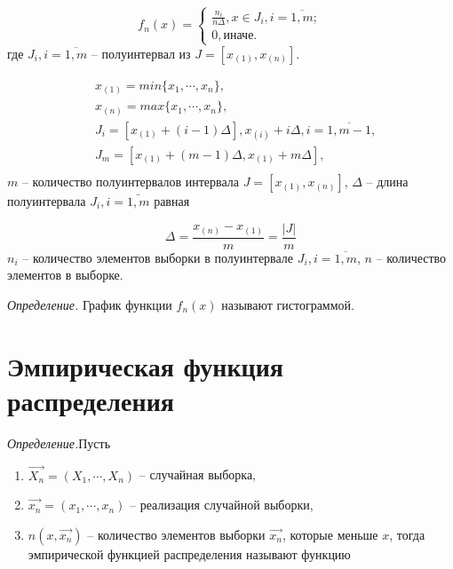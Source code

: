 \begin{equation}
    f_n(x) = \begin{cases}
        \frac{n_i}{n\Delta}, x \in J_i, i = \overline{1, m}; \\
        0, \textit{иначе}.
    \end{cases}
\end{equation}
где $J_i, i = \overline{1, m}$ --  полуинтервал из $J=[x_{(1)}, x_{(n)}]$.

\begin{equation*}
\begin{split}
    &x_{(1)}=min\{x_1,\cdots,x_n\},\\
    &x_{(n)}=max\{x_1, \cdots, x_n\},\\
    &J_i=[x_{(1)}+(i-1)\Delta], x_{(i)}+i\Delta, i = \overline{1, m-1},\\
    &J_m=[x_{(1)}+(m-1)\Delta, x_{(1)}+m\Delta],\\
\end{split}
\end{equation*}
$m$ -- количество полуинтервалов интервала $J=[x_{(1)}, x_{(n)}]$,\newline
$\Delta$ -- длина полуинтервала $J_{i}, i=\bar{1, m}$ равная 

\begin{equation}
    \Delta=\frac{x_{(n)} - x_{(1)}}{m}=\frac{|J|}{m}
\end{equation}\newline
$n_{i}$ -- количество элементов выборки в полуинтервале $J_{i}, i = \overline{1, m}$,\newline
$n$ -- количество элементов в выборке.

\textit{Определение.} График функции $f_n(x)$ называют гистограммой.

\section{Эмпирическая функция распределения}
\textit{Определение.}Пусть
\begin{enumerate}
    \item $\vec{X_n}=(X_1,\cdots,X_n)$ -- случайная выборка,
    \item $\vec{x_n}=(x_1,\cdots,x_n)$ -- реализация случайной выборки,
    \item $n(x,\vec{x_n})$ -- количество элементов выборки $\vec{x_n}$, которые меньше $x$, тогда эмпирической функцией распределения называют функцию 
\end{enumerate}

